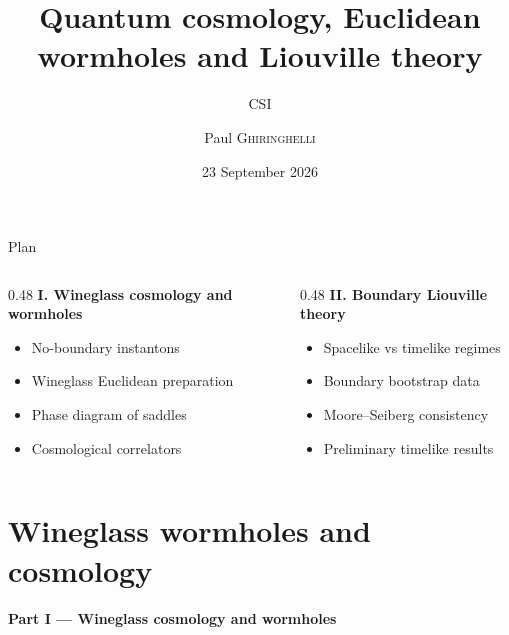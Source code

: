 \documentclass[aspectratio=169,smaller]{beamer}%
\title[Quantum cosmology and Liouville theory]{\textbf{Quantum cosmology, Euclidean wormholes and Liouville theory}}
\author[P. Ghiringhelli]{Paul \textsc{Ghiringhelli}}
\institute[CPHT École polytechnique]{École polytechnique, Centre de Physique Théorique (CPHT)}
\date{23 September 2026}
\subtitle{CSI}
\begin{document}



\begin{frame}{Plan}
  \begin{columns}[T]
    \begin{column}{0.48\textwidth}
      \textbf{I. Wineglass cosmology and wormholes}
      \begin{itemize}
        \item No-boundary instantons
        \item Wineglass Euclidean preparation
        \item Phase diagram of saddles
        \item Cosmological correlators
      \end{itemize}
    \end{column}
    \begin{column}{0.48\textwidth}
      \textbf{II. Boundary Liouville theory}
      \begin{itemize}
        \item Spacelike vs timelike regimes
        \item Boundary bootstrap data
        \item Moore--Seiberg consistency
        \item Preliminary timelike results
      \end{itemize}
    \end{column}
  \end{columns}
\end{frame}

\section{Wineglass wormholes and cosmology}

\begin{frame}[plain]
  \centering
  {\Large\textbf{Part I --- Wineglass cosmology and wormholes}}\\[0.6cm]
\end{frame}
\end{document}

